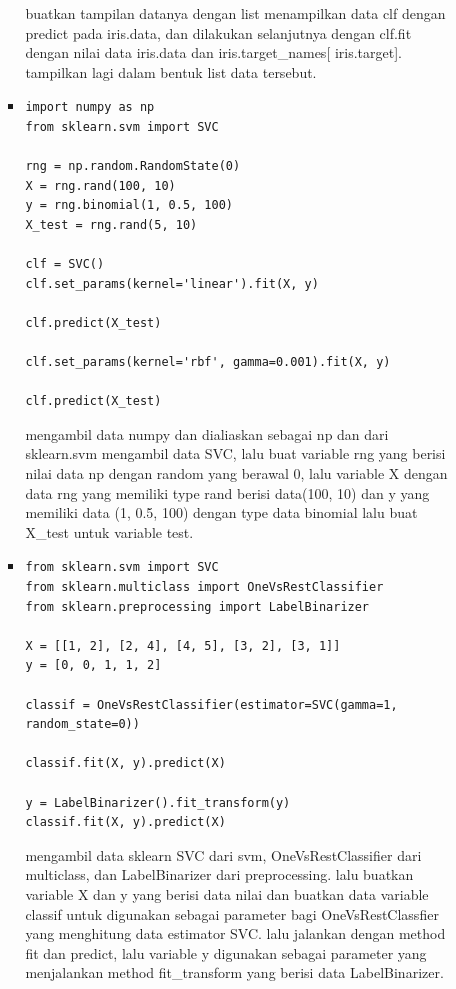 \begin{enumerate}
\begin{itemize}
\begin{itemize}
buatkan tampilan datanya dengan list menampilkan data clf dengan predict pada iris.data, dan dilakukan selanjutnya dengan clf.fit dengan nilai data iris.data dan iris.target\_names[ iris.target]. tampilkan lagi dalam bentuk list data tersebut.

\item
\begin{verbatim}
import numpy as np
from sklearn.svm import SVC

rng = np.random.RandomState(0)
X = rng.rand(100, 10)
y = rng.binomial(1, 0.5, 100)
X_test = rng.rand(5, 10)

clf = SVC()
clf.set_params(kernel='linear').fit(X, y)

clf.predict(X_test)

clf.set_params(kernel='rbf', gamma=0.001).fit(X, y)

clf.predict(X_test)
\end{verbatim}
\subitem
mengambil data numpy dan dialiaskan sebagai np dan dari sklearn.svm mengambil data SVC,  lalu buat variable rng yang berisi nilai data np dengan random yang berawal 0, lalu variable X dengan data rng yang memiliki type rand berisi data(100, 10) dan y yang memiliki data (1, 0.5, 100) dengan type data binomial lalu buat X\_test untuk variable test.

\item
\begin{verbatim}
from sklearn.svm import SVC
from sklearn.multiclass import OneVsRestClassifier
from sklearn.preprocessing import LabelBinarizer

X = [[1, 2], [2, 4], [4, 5], [3, 2], [3, 1]]
y = [0, 0, 1, 1, 2]

classif = OneVsRestClassifier(estimator=SVC(gamma=1, random_state=0))

classif.fit(X, y).predict(X)

y = LabelBinarizer().fit_transform(y)
classif.fit(X, y).predict(X)
\end{verbatim}
\subitem
mengambil data sklearn SVC dari svm, OneVsRestClassifier dari multiclass, dan LabelBinarizer dari preprocessing. lalu buatkan variable X dan y yang berisi data nilai dan buatkan data variable classif untuk digunakan sebagai parameter bagi OneVsRestClassfier yang menghitung data estimator SVC. lalu jalankan dengan method fit dan predict, lalu variable y digunakan sebagai parameter yang menjalankan method fit\_transform yang berisi data LabelBinarizer.


\end{itemize}
\end{itemize}
\end{enumerate}
